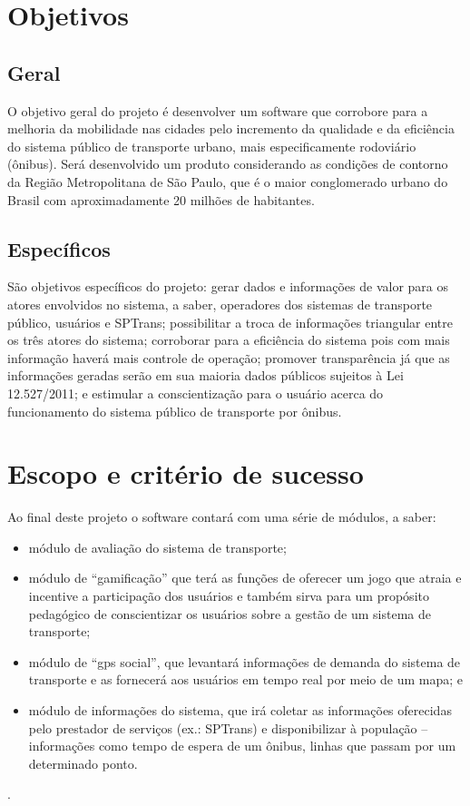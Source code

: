\section{Objetivos}\label{sec:objetivos}

\subsection{Geral}\label{subsec:objGerais}
O objetivo geral do projeto é desenvolver um software que corrobore para a melhoria da mobilidade nas cidades pelo incremento da qualidade e da eficiência do sistema público de transporte urbano, mais especificamente rodoviário (ônibus). Será desenvolvido um produto considerando as condições de contorno da Região Metropolitana de São Paulo, que é o maior conglomerado urbano do Brasil com aproximadamente 20 milhões de habitantes. 

\subsection{Específicos}\label{subsec:objEspec}
São objetivos específicos do projeto: gerar dados e informações de valor para os atores envolvidos no sistema, a saber, operadores dos sistemas de transporte público, usuários e SPTrans; possibilitar a troca de informações triangular entre os três atores do sistema; corroborar para a eficiência do sistema pois com mais informação haverá mais controle de operação; promover transparência já que as informações geradas serão em sua maioria dados públicos sujeitos à Lei 12.527/2011; e estimular a conscientização para o usuário acerca do funcionamento do sistema público de transporte por ônibus.
	
\section{Escopo e critério de sucesso}\label{sec:Escopo}
	Ao final deste projeto o software contará com uma série de módulos, a saber:
	\begin{itemize}%
		\item módulo de avaliação do sistema de transporte;
		\item módulo de “gamificação” que terá as funções de oferecer um jogo que atraia e incentive a participação dos usuários e também sirva para um propósito pedagógico de conscientizar os usuários sobre a gestão de um sistema de transporte;
		\item módulo de “gps social”, que levantará informações de demanda do sistema de transporte e as fornecerá aos usuários em tempo real por meio de um mapa; e
		\item módulo de informações do sistema, que irá coletar as informações oferecidas pelo prestador de serviços (ex.: SPTrans) e disponibilizar à população – informações como tempo de espera de um ônibus, linhas que passam por um determinado ponto.
	\end{itemize}.

